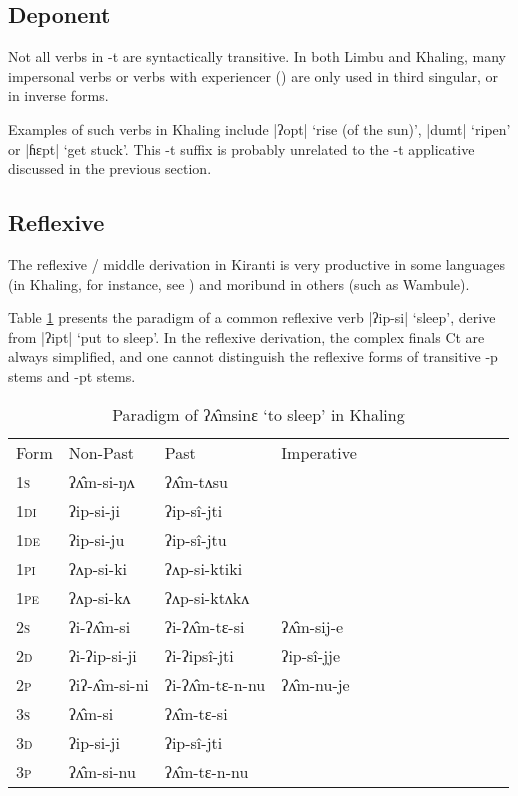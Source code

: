 \documentclass[oneside,a4paper,11pt]{article}
\newcommand{\ipa}[1]{{\phon\mbox{#1}}} %
\newcommand{\grise}[1]{\cellcolor{lightgray}\textbf{#1}}
\newcommand{\dhatu}[2]{|\ipa{#1}| `#2'}
\begin{document}
\subsection{Deponent} \label{sec:deponent}
Not all verbs in \ipa{-t} are syntactically transitive. In both Limbu and Khaling, many impersonal verbs or verbs with experiencer (\citealt{michailovsky97deponent}) are only used in third singular, or in inverse forms.  

Examples of such verbs in Khaling include \dhatu{ʔopt}{rise (of the sun)},  \dhatu{dumt}{ripen} or \dhatu{ɦɛpt}{get stuck}. This \ipa{-t} suffix is probably unrelated to the \ipa{-t} applicative discussed in the previous section. 

\subsection{Reflexive} \label{sec:refl}
The reflexive / middle derivation in Kiranti is very productive in some languages (in Khaling, for instance, see \citealt{jacques16si}) and moribund in others (such as Wambule). 


Table \ref{tab:ip.vr} presents the paradigm of a common reflexive verb \dhatu{ʔip-si}{sleep}, derive from \dhatu{ʔipt}{put to sleep}. In the reflexive derivation, the complex finals Ct are always simplified, and one cannot distinguish the reflexive forms of transitive \ipa{-p} stems and \ipa{-pt} stems.

\begin{table}[h]
\label{tab:ip.vr} \centering 
\caption{Paradigm of \ipa{ʔʌ̂msinɛ}  `to sleep' in Khaling }
\begin{tabular}{l|l|l|l|l|l|l|l|l|l|l|l|l} 
\toprule
Form& Non-Past & Past & Imperative \\
\textsc{1s} & \ipa{ʔʌ̂m-si-ŋʌ}  \grise{}& \ipa{ʔʌ̂m-tʌsu} \grise{}&\\ 
\textsc{1di} &\ipa{ʔip-si-ji}  & \ipa{ʔip-sî-jti}  & \\
\textsc{1de} &\ipa{ʔip-si-ju}  & \ipa{ʔip-sî-jtu}  & \\ 
\textsc{1pi} &\ipa{ʔʌp-si-ki}  & \ipa{ʔʌp-si-ktiki} & \\ 
\textsc{1pe} &\ipa{ʔʌp-si-kʌ}  & \ipa{ʔʌp-si-ktʌkʌ} &  \\ 
\textsc{2s} & \ipa{ʔi-ʔʌ̂m-si}  \grise{}& \ipa{ʔi-ʔʌ̂m-tɛ-si} \grise{} & \ipa{ʔʌ̂m-sij-e}  \grise{}\\ 
\textsc{2d} & \ipa{ʔi-ʔip-si-ji}  & \ipa{ʔi-ʔipsî-jti}  & \ipa{ʔip-sî-jje}    \\
\textsc{2p} & \ipa{ʔiʔ-ʌ̂m-si-ni} \grise{} & \ipa{ʔi-ʔʌ̂m-tɛ-n-nu} \grise{} & \ipa{ʔʌ̂m-nu-je}  \grise{}\\ 
\textsc{3s} & \ipa{ʔʌ̂m-si}  \grise{}& \ipa{ʔʌ̂m-tɛ-si}  \grise{} &\\ 
\textsc{3d} & \ipa{ʔip-si-ji}  & \ipa{ʔip-sî-jti} &  \\ 
\textsc{3p} & \ipa{ʔʌ̂m-si-nu}\grise{}  & \ipa{ʔʌ̂m-tɛ-n-nu} \grise{}&\\ 
\bottomrule
\end{tabular}
\end{table}
\end{document}
